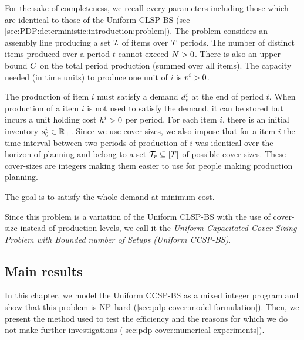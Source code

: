 For the sake of completeness, we recall every parameters including those which are identical to those of the Uniform CLSP-BS (see \cref{sec:PDP:deterministic:introduction:problem}).
The problem considers an assembly line producing a set $\mathcal{I}$ of items over $T$ periods.
The number of distinct items produced over a period $t$ cannot exceed $N>0$.
There is also an upper bound $C$ on the total period production (summed over all items).
The capacity needed (in time units) to produce one unit of $i$ is $v^i>0$.


The production of item $i$ must satisfy a demand $d_t^i$ at the end of period $t$.
When production of a item $i$ is not used to satisfy the demand, it can be stored but incurs a unit holding cost $h^i>0$ per period.
For each item $i$, there is an initial inventory $s_0^i\in\mathbb{R}_+$.
Since we use cover-sizes, we also impose that for a item $i$ the time interval between two periods of production of $i$ was identical over the horizon of planning and belong to a set $\coverset_r\subseteq\range{\horizon}$ of possible cover-sizes.
These cover-sizes are integers making them easier to use for people making production planning.


The goal is to satisfy the whole demand at minimum cost.


Since this problem is a variation of the Uniform CLSP-BS with the use of cover-size instead of production levels, we call it the \emph{Uniform Capacitated Cover-Sizing Problem with Bounded number of Setups (Uniform CCSP-BS)}.



\subsection{Main results}


In this chapter, we model the Uniform CCSP-BS as a mixed integer program and show that this problem is $\operatorname{NP}$-hard (\cref{sec:pdp-cover:model-formulation}).
Then, we present the method used to test the efficiency and the reasons for which we do not make further investigations (\cref{sec:pdp-cover:numerical-experiments}).







